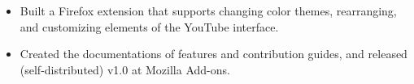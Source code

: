 

\begin{itemize}[nosep]
  \item Built a Firefox extension that supports changing color themes, rearranging, and customizing elements of the YouTube interface.
  \item Created the documentations of features and contribution guides, and released (self-distributed) v1.0 at Mozilla Add-ons.
\end{itemize}
